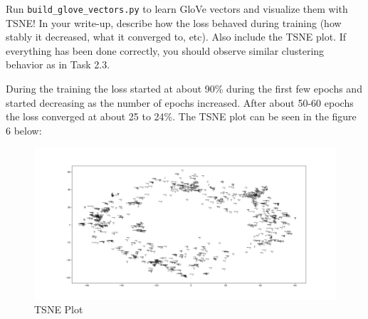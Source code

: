 \documentclass[a4paper,10pt]{article}
\begin{document}
\vspace{5pt}
\begin{taskbox}
 Run \texttt{build\_glove\_vectors.py} to learn GloVe vectors and visualize them with TSNE! In your write-up, describe how the loss behaved during training (how stably it decreased, what it converged to, etc). Also include the TSNE plot. If everything has been done correctly, you should observe similar clustering behavior as in Task 2.3.
\end{taskbox} 
\begin{answerbox}
    During the training the loss started at about 90\% during the first few epochs and started decreasing as the number of epochs increased. After about 50-60 epochs the loss converged at about 25 to 24\%.
    The TSNE plot can be seen in the figure 6 below:
\end{answerbox}
\begin{figure}[H]
    \centering
    \includegraphics[width=0.5\linewidth]{build_glove_2.png}
    \caption{TSNE Plot}
    \label{fig:enter-label}
\end{figure}
\vspace{5pt}
\end{document}

